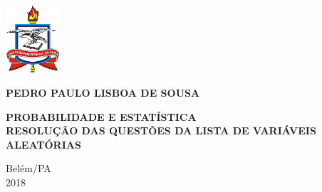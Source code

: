 \thispagestyle{empty}
\begin{titlepage}
  \begin{center}
    \includegraphics[height=2.5cm]{./figuras/brasaoUFPA.png}\\
    {}
  \end{center}
  \vspace{3.6cm}
  \begin{center}
   {\large {\uppercase{\textbf{Pedro Paulo Lisboa de Sousa}}}}
  \end{center}
  \vspace{3cm}
  \begin{center}
    {\bf{
        \large{ \uppercase{Probabilidade e Estatística} } \\
    \normalsize{ \uppercase{Resolução das questões da lista de Variáveis Aleatórias} }}}
  \end{center}
  \vfill
  \begin{center}
    \begin{small}
      Belém/PA\\
      2018
    \end{small}
  \end{center}
  \newpage
  
\end{titlepage}
